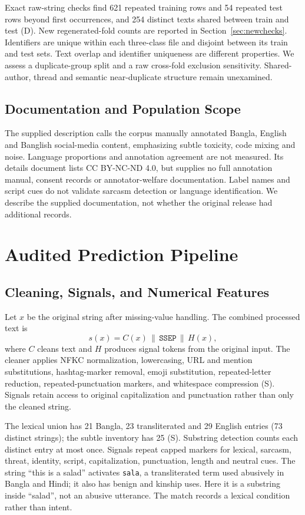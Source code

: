 \documentclass[doublecolumn]{ijcvsplatex}
\begin{document}
Exact raw-string checks find 621 repeated training rows and 54 repeated test rows beyond first occurrences, and 254 distinct texts shared between train and test (D). New regenerated-fold counts are reported in Section~\ref{sec:newchecks}. Identifiers are unique within each three-class file and disjoint between its train and test sets. Text overlap and identifier uniqueness are different properties. We assess a duplicate-group split and a raw cross-fold exclusion sensitivity. Shared-author, thread and semantic near-duplicate structure remain unexamined.

\subsection{Documentation and Population Scope}
The supplied description calls the corpus manually annotated Bangla, English and Banglish social-media content, emphasizing subtle toxicity, code mixing and noise. Language proportions and annotation agreement are not measured. Its details document lists CC BY-NC-ND 4.0, but supplies no full annotation manual, consent records or annotator-welfare documentation. Label names and script cues do not validate sarcasm detection or language identification. We describe the supplied documentation, not whether the original release had additional records.

\section{Audited Prediction Pipeline}
\label{sec:pipeline}

\subsection{Cleaning, Signals, and Numerical Features}
Let $x$ be the original string after missing-value handling. The combined processed text is
\begin{equation}
s(x)=C(x)\,\|\,\texttt{SSEP}\,\|\,H(x),
\end{equation}
where $C$ cleans text and $H$ produces signal tokens from the original input. The cleaner applies NFKC normalization, lowercasing, URL and mention substitutions, hashtag-marker removal, emoji substitution, repeated-letter reduction, repeated-punctuation markers, and whitespace compression (S). Signals retain access to original capitalization and punctuation rather than only the cleaned string.

The lexical union has 21 Bangla, 23 transliterated and 29 English entries (73 distinct strings); the subtle inventory has 25 (S). Substring detection counts each distinct entry at most once. Signals repeat capped markers for lexical, sarcasm, threat, identity, script, capitalization, punctuation, length and neutral cues. The string ``this is a salad'' activates \texttt{sala}, a transliterated term used abusively in Bangla and Hindi; it also has benign and kinship uses. Here it is a substring inside ``salad'', not an abusive utterance. The match records a lexical condition rather than intent.
\end{document}
